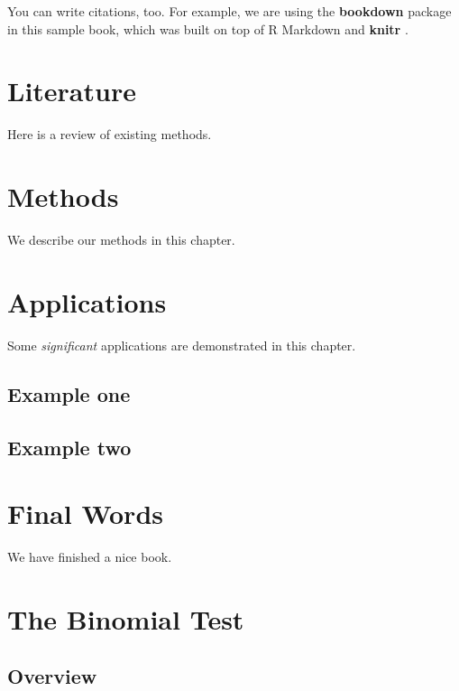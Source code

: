 \documentclass[
]{book}
\begin{document}
You can write citations, too. For example, we are using the \textbf{bookdown} package \citep{R-bookdown} in this sample book, which was built on top of R Markdown and \textbf{knitr} \citep{sascomstat}.

\hypertarget{literature}{%
\chapter{Literature}\label{literature}}

Here is a review of existing methods.

\hypertarget{methods}{%
\chapter{Methods}\label{methods}}

We describe our methods in this chapter.

\hypertarget{applications}{%
\chapter{Applications}\label{applications}}

Some \emph{significant} applications are demonstrated in this chapter.

\hypertarget{example-one}{%
\section{Example one}\label{example-one}}

\hypertarget{example-two}{%
\section{Example two}\label{example-two}}

\hypertarget{final-words}{%
\chapter{Final Words}\label{final-words}}

We have finished a nice book.

\hypertarget{the-binomial-test}{%
\chapter{The Binomial Test}\label{the-binomial-test}}

\hypertarget{overview}{%
\section{Overview}\label{overview}}
\end{document}
